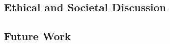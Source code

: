 

\subsection{Ethical and Societal Discussion}
\label{ch:concl:ethical}

\subsection{Future Work}
\label{ch:concl:future-work}
